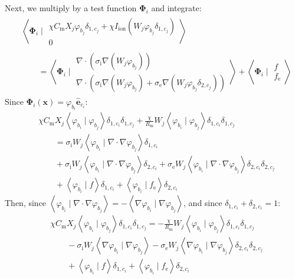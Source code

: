\documentclass{article}
\newcommand{\bvec}[1]{\boldsymbol{#1}}
\newcommand{\brvec}[1]{\mathbf{#1}}
\begin{document}
Next, we multiply by a test function $\bvec{\Phi}_i$ and integrate:
\begin{align*}
    & \left< \bvec{\Phi}_i \mid \begin{matrix}
            \chi C_\text{m} X_j \varphi_{b_j} \delta_{1,c_j} + \chi I_\text{ion}(W_j \varphi_{b_j} \delta_{1,c_j}) \\
            0
        \end{matrix} \right> \\
    & \qquad = \left< \bvec{\Phi}_i \mid \begin{matrix}
            \nabla \cdot (\sigma_\text{i} \nabla (W_j \varphi_{b_j})) \\
            \nabla \cdot (\sigma_\text{i} \nabla (W_j \varphi_{b_j})
                + \sigma_\text{e} \nabla (W_j \varphi_{b_j} \delta_{2,c_j}))
        \end{matrix} \right>
        + \left< \bvec{\Phi}_i \mid \begin{matrix}
            f \\
            f_\text{e}
        \end{matrix} \right>
\end{align*}
\noindent Since $\bvec{\Phi}_i(\bvec{x}) = \varphi_{b_i} \hat{\brvec{e}}_{c_i}$:
\begin{align*}
    & \chi C_\text{m} X_j \left< \varphi_{b_i} \mid \varphi_{b_j} \right> \delta_{1,c_i} \delta_{1,c_j}
            + \frac{\chi}{R_\text{m}} W_j \left< \varphi_{b_i} \mid \varphi_{b_j} \right> \delta_{1,c_i} \delta_{1,c_j} \\
        & \qquad = \sigma_\text{i} W_j \left< \varphi_{b_i} \mid \nabla \cdot \nabla \varphi_{b_j} \right> \delta_{1,c_i} \\
        & \qquad + \sigma_\text{i} W_j \left< \varphi_{b_i} \mid \nabla \cdot \nabla \varphi_{b_j} \right> \delta_{2,c_i}
            + \sigma_\text{e} W_j \left< \varphi_{b_i} \mid \nabla \cdot \nabla \varphi_{b_j} \right> \delta_{2,c_i} \delta_{2,c_j} \\
        & \qquad + \left< \varphi_{b_i} \mid f \right> \delta_{1,c_i}
            + \left< \varphi_{b_i} \mid f_\text{e} \right> \delta_{2,c_i}
\end{align*}
\noindent Then, since $\left< \varphi_{b_i} \mid \nabla \cdot \nabla \varphi_{b_j} \right>
    = - \left< \nabla \varphi_{b_i} \mid \nabla \varphi_{b_j} \right>$,
and since $\delta_{1,c_i} + \delta_{2,c_i} = 1$:
\begin{align*}
    & \chi C_\text{m} X_j \left< \varphi_{b_i} \mid \varphi_{b_j} \right> \delta_{1,c_i} \delta_{1,c_j}
            = - \frac{\chi}{R_\text{m}} W_j \left< \varphi_{b_i} \mid \varphi_{b_j} \right> \delta_{1,c_i} \delta_{1,c_j} \\
        & \qquad - \sigma_\text{i} W_j \left< \nabla \varphi_{b_i} \mid \nabla \varphi_{b_j} \right>
            - \sigma_\text{e} W_j \left< \nabla \varphi_{b_i} \mid \nabla \varphi_{b_j} \right> \delta_{2,c_i} \delta_{2,c_j} \\
        & \qquad + \left< \varphi_{b_i} \mid f \right> \delta_{1,c_i}
            + \left< \varphi_{b_i} \mid f_\text{e} \right> \delta_{2,c_i}
\end{align*}
\end{document}
